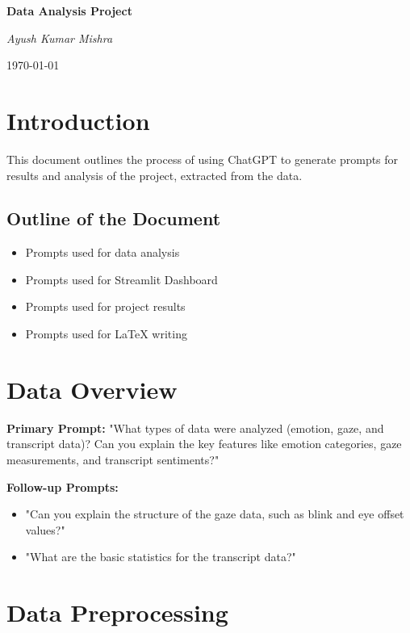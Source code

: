\documentclass[11pt,a4paper]{article}
\begin{document}
\begin{titlepage}
\centering
{\Huge\bfseries Data Analysis Project\par}
\vspace{2cm}
{\Large\itshape Ayush Kumar Mishra\par}
\vfill
{\large \today\par}
\end{titlepage}

\tableofcontents

\newpage

\section{Introduction}
\label{sec:intro}
This document outlines the process of using ChatGPT to generate prompts for results and analysis of the project, extracted from the data.

\subsection{Outline of the Document}
\begin{itemize}[leftmargin=*]
    \item Prompts used for data analysis
    \item Prompts used for Streamlit Dashboard
    \item Prompts used for project results
    \item Prompts used for LaTeX writing
\end{itemize}

\section{Data Overview}
\label{sec:data-overview}

\textbf{Primary Prompt:} "What types of data were analyzed (emotion, gaze, and transcript data)? Can you explain the key features like emotion categories, gaze measurements, and transcript sentiments?"

\textbf{Follow-up Prompts:}
\begin{itemize}[leftmargin=*]
    \item "Can you explain the structure of the gaze data, such as blink and eye offset values?"
    \item "What are the basic statistics for the transcript data?"
\end{itemize}

\section{Data Preprocessing}
\label{sec:preprocessing}
\end{document}
